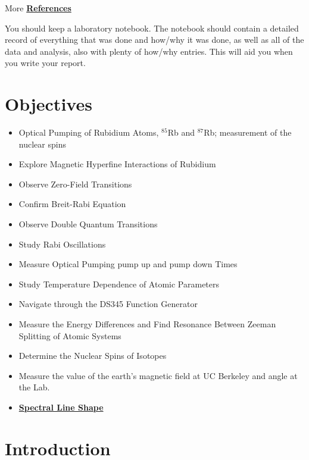 \documentclass{../lab}
\newcommand{\SpectralLineShape}{https://en.wikipedia.org/wiki/Spectral_line_shape}
\begin{document}
\vspace{1em}

\noindent More \hyperref[references]{\textbf{References}}

\vspace{1em}

\noindent You should keep a laboratory notebook. The notebook should contain a detailed record of everything that was done and how/why it was done, as well as all of the data and analysis, also with plenty of how/why entries. This will aid you when you write your report.

\section{Objectives}
\begin{itemize}
    \item Optical Pumping of Rubidium Atoms, $^{85}$Rb and $^{87}$Rb; measurement of the nuclear spins
    \item Explore Magnetic Hyperfine Interactions of Rubidium
    \item Observe Zero-Field Transitions
    \item Confirm Breit-Rabi Equation
    \item Observe Double Quantum Transitions
    \item Study Rabi Oscillations
    \item Measure Optical Pumping pump up and pump down Times
    \item Study Temperature Dependence of Atomic Parameters
    \item Navigate through the DS345 Function Generator
    \item Measure the Energy Differences and Find Resonance Between Zeeman Splitting of Atomic Systems
    \item Determine the Nuclear Spins of Isotopes
    \item Measure the value of the earth's magnetic field at UC Berkeley and angle at the Lab.
    \item \href{\SpectralLineShape}{\textbf{Spectral Line Shape}}
\end{itemize}

\section{Introduction}
\end{document}
